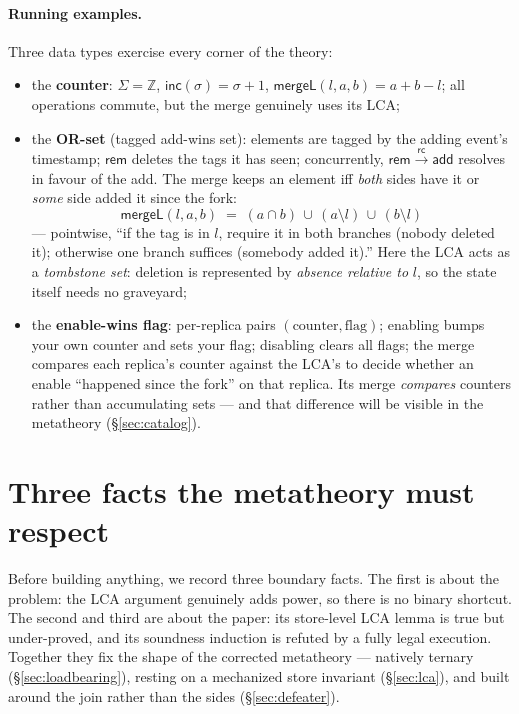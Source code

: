 \documentclass[11pt]{article}
\newcommand{\rc}{\xrightarrow{\mathsf{rc}}}
\newcommand{\add}{\mathsf{add}}
\newcommand{\rem}{\mathsf{rem}}
\newcommand{\mergeL}{\mathsf{mergeL}}
\begin{document}
\paragraph{Running examples.} Three data types exercise every corner of
the theory:
\begin{itemize}[leftmargin=2em]
\item the \textbf{counter}: $\Sigma = \mathbb{Z}$,
  $\mathsf{inc}(\sigma) = \sigma+1$, $\mergeL(l,a,b) = a+b-l$; all
  operations commute, but the merge genuinely uses its LCA;
\item the \textbf{OR-set} (tagged add-wins set): elements are tagged by
  the adding event's timestamp; $\rem$ deletes the tags it has seen;
  concurrently, $\rem \rc \add$ resolves in favour of the add. The merge
  keeps an element iff \emph{both} sides have it or \emph{some} side added
  it since the fork:
  \[
    \mergeL(l,a,b) \;=\; (a \cap b) \,\cup\, (a \setminus l) \,\cup\, (b
    \setminus l)
  \]
  --- pointwise, ``if the tag is in $l$, require it in both branches
  (nobody deleted it); otherwise one branch suffices (somebody added
  it).'' Here the LCA acts as a \emph{tombstone set}: deletion is
  represented by \emph{absence relative to} $l$, so the state itself needs
  no graveyard;
\item the \textbf{enable-wins flag}: per-replica pairs
  $(\text{counter},\text{flag})$; enabling bumps your own counter and sets
  your flag; disabling clears all flags; the merge compares each
  replica's counter against the LCA's to decide whether an enable
  ``happened since the fork'' on that replica. Its merge \emph{compares}
  counters rather than accumulating sets --- and that difference will be
  visible in the metatheory (\S\ref{sec:catalog}).
\end{itemize}

\section{Three facts the metatheory must respect}

Before building anything, we record three boundary facts. The first is
about the problem: the LCA argument genuinely adds power, so there is no
binary shortcut. The second and third are about the paper: its
store-level LCA lemma is true but under-proved, and its soundness
induction is refuted by a fully legal execution. Together they fix the
shape of the corrected metatheory --- natively ternary
(\S\ref{sec:loadbearing}), resting on a mechanized store invariant
(\S\ref{sec:lca}), and built around the join rather than the sides
(\S\ref{sec:defeater}).
\end{document}
